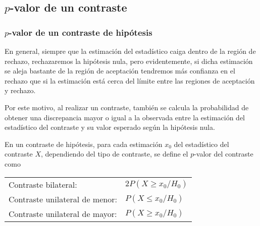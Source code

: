 \subsection{$p$-valor de un contraste}
\begin{frame}
\frametitle{$p$-valor de un contraste de hipótesis}
En general, siempre que la estimación del estadístico caiga dentro de la región de rechazo, rechazaremos la hipótesis
nula, pero evidentemente, si dicha estimación se aleja bastante de la región de aceptación tendremos más confianza en el
rechazo que si la estimación está cerca del límite entre las regiones de aceptación y rechazo.

Por este motivo, al realizar un contraste, también se calcula la probabilidad de obtener una discrepancia mayor o igual
a la observada entre la estimación del estadístico del contraste y su valor esperado según la hipótesis nula. 
\begin{definicion}[$p$-valor]
En un contraste de hipótesis, para cada estimación $x_0$ del estadístico del contraste $X$, dependiendo del tipo de
contraste, se define el $p$-valor del contraste como
\begin{center} 
\begin{tabular}{ll}
Contraste bilateral: & $2P(X\geq x_0/H_0)$\\
Contraste unilateral de menor: & $P(X\leq x_0/H_0)$\\
Contraste unilateral de mayor: & $P(X\geq x_0/H_0)$
\end{tabular}
\end{center}
\end{definicion}
\end{frame}




